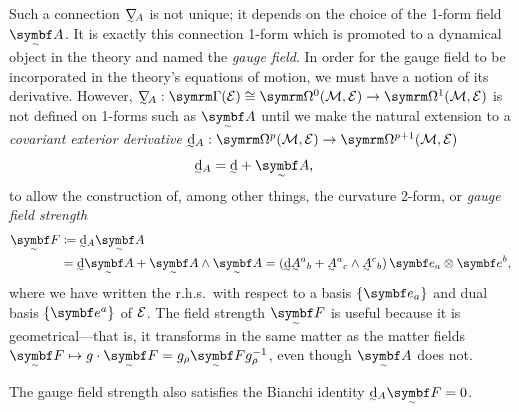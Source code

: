 Such a connection $\ts\nabla_{\!A}$ is not unique; it depends on the choice of the 1-form field $\tsbm A$.
It is exactly this connection 1-form which is promoted to a dynamical object in the theory and named the \emph{gauge field}.
In order for the gauge field to be incorporated in the theory's equations of motion, we must have a notion of its derivative.
However, $\ts\nabla_{\!A} : \secs(\cal E) \cong \forms^0(\cal M, \cal E) \to \forms^1(\cal M, \cal E)$ is not defined on 1-forms such as $\tsbm A$ until we make the natural extension\footnotemark{} to a \emph{covariant exterior derivative}
$\ts\dd_A : \forms^p(\cal M, \cal E) \to \forms^{p + 1}(\cal M, \cal E)$
\begin{align}
	\ts\dd_A &= \ts\dd + \tsbm A
,\end{align}
%
to allow the construction of, among other things, the curvature 2-form, or \emph{gauge field strength}
\begin{align}
	\tsbm F &\coloneq \ts\dd_A\tsbm A
\\	&= \ts\dd\tsbm A + \tsbm A \wedge \tsbm A
	= (\ts\dd\ts A^a{}_b + \ts A^a{}_c \wedge \ts A^c{}_b) \, \bm e_a \otimes \bm e^b
,\end{align}
where we have written the r.h.s.\ with respect to a basis $\qty{\bm e_a}$ and dual basis $\qty{\bm e^a}$ of $\cal E$.
The field strength $\tsbm F$ is useful because it is geometrical---that is, it transforms in the same matter as the matter fields $\tsbm F \mapsto g\cdot\tsbm F = g_\rho\tsbm F g_\rho^{-1}$, even though $\tsbm A$ does not.

The gauge field strength also satisfies the Bianchi identity $\ts\dd_A\tsbm F = 0$.

